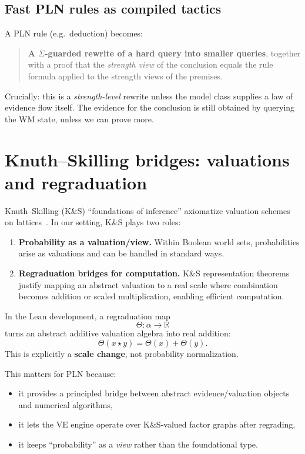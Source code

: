 \documentclass[11pt]{article}
\begin{document}
\subsection{Fast PLN rules as compiled tactics}

A PLN rule (e.g.\ deduction) becomes:

\begin{quote}
\textbf{A $\Sigma$-guarded rewrite of a hard query into smaller queries}, together with a proof
that the \emph{strength view} of the conclusion equals the rule formula applied to
the strength views of the premises.
\end{quote}

Crucially: this is a \emph{strength-level} rewrite unless the model class supplies a law of
evidence flow itself. The evidence for the conclusion is still obtained by querying the WM state,
unless we can prove more.

\section{Knuth--Skilling bridges: valuations and regraduation}

Knuth--Skilling (K\&S) ``foundations of inference'' axiomatize valuation schemes on lattices~\cite{KnuthSkilling}.
In our setting, K\&S plays two roles:

\begin{enumerate}[leftmargin=2em]
\item \textbf{Probability as a valuation/view.}
Within Boolean world sets, probabilities arise as valuations and can be handled in standard ways.
\item \textbf{Regraduation bridges for computation.}
K\&S representation theorems justify mapping an abstract valuation to a real scale where
combination becomes addition or scaled multiplication, enabling efficient computation.
\end{enumerate}

In the Lean development, a regraduation map
\[
  \Theta : \alpha \to \mathbb{R}
\]
turns an abstract additive valuation algebra into real addition:
\[
  \Theta(x \star y) = \Theta(x) + \Theta(y).
\]
This is explicitly a \textbf{scale change}, not probability normalization.

This matters for PLN because:
\begin{itemize}[leftmargin=2em]
\item it provides a principled bridge between abstract evidence/valuation objects and numerical algorithms,
\item it lets the VE engine operate over K\&S-valued factor graphs after regrading,
\item it keeps ``probability'' as a \emph{view} rather than the foundational type.
\end{itemize}
\end{document}
